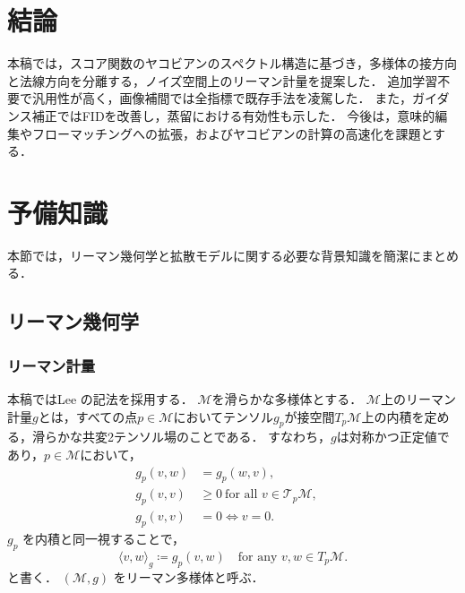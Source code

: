 \documentclass[MIRU,submit]{miru2026j}
\theoremstyle{definition}
\newcommand{\gM}{{\mathcal{M}}}
\newcommand{\gT}{{\mathcal{T}}}
\begin{document}
\section{結論}


本稿では，スコア関数のヤコビアンのスペクトル構造に基づき，多様体の接方向と法線方向を分離する，ノイズ空間上のリーマン計量を提案した．
追加学習不要で汎用性が高く，画像補間では全指標で既存手法を凌駕した．
また，ガイダンス補正ではFIDを改善し，蒸留における有効性も示した．
今後は，意味的編集やフローマッチングへの拡張，およびヤコビアンの計算の高速化を課題とする．

\clearpage




\clearpage

\appendix

\section{予備知識}
\label{sec:preliminaries}

本節では，リーマン幾何学と拡散モデルに関する必要な背景知識を簡潔にまとめる．

\subsection{リーマン幾何学}
\label{appendix:riemannian_geometry}

\subsubsection{リーマン計量}
本稿ではLee \cite{Lee2019}の記法を採用する．
$\gM$を滑らかな多様体とする．
$\gM$上のリーマン計量$g$とは，すべての点$p \in \gM$においてテンソル$g_p$が接空間$T_p\gM$上の内積を定める，滑らかな共変2テンソル場のことである．
すなわち，$g$は対称かつ正定値であり，$p\in\gM$において，
\begin{equation}
    \begin{aligned}
        \textstyle
        g_p(v,w) & =g_p(w,v),\quad                             \\
        \textstyle
        g_p(v,v) & \ge 0 \ \text{for all } v\in \gT_p\gM,\quad \\
        \textstyle
        g_p(v,v) & =0 \Leftrightarrow v=0.
    \end{aligned}
\end{equation}
$g_p$ を内積と同一視することで，
\begin{equation}
    \textstyle
    \langle v, w\rangle_g \coloneq g_p(v,w) \quad \text{for any } v,w\in T_p\gM.
\end{equation}
と書く．
$(\gM, g)$ をリーマン多様体と呼ぶ．
\end{document}
